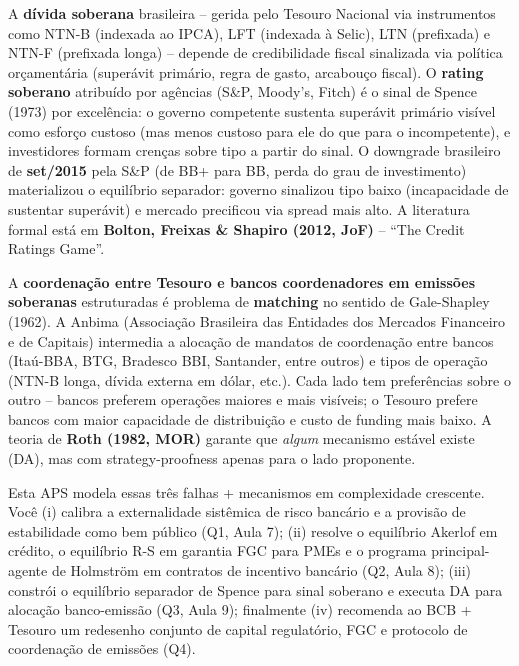 \documentclass[11pt,addpoints]{exam}
\begin{document}
\begin{contextbox}
A \textbf{dívida soberana} brasileira -- gerida pelo Tesouro Nacional via instrumentos como NTN-B (indexada ao IPCA), LFT (indexada à Selic), LTN (prefixada) e NTN-F (prefixada longa) -- depende de credibilidade fiscal sinalizada via política orçamentária (superávit primário, regra de gasto, arcabouço fiscal). O \textbf{rating soberano} atribuído por agências (S\&P, Moody's, Fitch) é o sinal de Spence (1973) por excelência: o governo competente sustenta superávit primário visível como esforço custoso (mas menos custoso para ele do que para o incompetente), e investidores formam crenças sobre tipo a partir do sinal. O downgrade brasileiro de \textbf{set/2015} pela S\&P (de BB+ para BB, perda do grau de investimento) materializou o equilíbrio separador: governo sinalizou tipo baixo (incapacidade de sustentar superávit) e mercado precificou via spread mais alto. A literatura formal está em \textbf{Bolton, Freixas \& Shapiro (2012, JoF)} -- ``The Credit Ratings Game''.

A \textbf{coordenação entre Tesouro e bancos coordenadores em emissões soberanas} estruturadas é problema de \textbf{matching} no sentido de Gale-Shapley (1962). A Anbima (Associação Brasileira das Entidades dos Mercados Financeiro e de Capitais) intermedia a alocação de mandatos de coordenação entre bancos (Itaú-BBA, BTG, Bradesco BBI, Santander, entre outros) e tipos de operação (NTN-B longa, dívida externa em dólar, etc.). Cada lado tem preferências sobre o outro -- bancos preferem operações maiores e mais visíveis; o Tesouro prefere bancos com maior capacidade de distribuição e custo de funding mais baixo. A teoria de \textbf{Roth (1982, MOR)} garante que \emph{algum} mecanismo estável existe (DA), mas com strategy-proofness apenas para o lado proponente.

Esta APS modela essas três falhas + mecanismos em complexidade crescente. Você (i) calibra a externalidade sistêmica de risco bancário e a provisão de estabilidade como bem público (Q1, Aula 7); (ii) resolve o equilíbrio Akerlof em crédito, o equilíbrio R-S em garantia FGC para PMEs e o programa principal-agente de Holmström em contratos de incentivo bancário (Q2, Aula 8); (iii) constrói o equilíbrio separador de Spence para sinal soberano e executa DA para alocação banco-emissão (Q3, Aula 9); finalmente (iv) recomenda ao BCB + Tesouro um redesenho conjunto de capital regulatório, FGC e protocolo de coordenação de emissões (Q4).


\end{contextbox}
\end{document}
